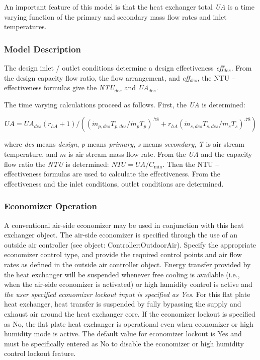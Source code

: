 An important feature of this model is that the heat exchanger total \emph{UA} is a time varying function of the primary and secondary mass flow rates and inlet temperatures.

\subsubsection{Model Description}\label{model-description-1-007}

The design inlet / outlet conditions determine a design effectiveness \emph{eff}\(_{des}\). From the design capacity flow ratio, the flow arrangement, and \emph{eff}\(_{des}\), the NTU -- effectiveness formulas give the \emph{NTU\(_{des}\)} and \emph{UA\(_{des}\)}.

The time varying calculations proceed as follows. First, the \emph{UA} is determined:

\begin{equation}
UA = U{A_{des}}({r_{hA}} + 1)/({({\dot m_{p,des}}{T_{p,des}}/{\dot m_p}{T_p})^{.78}} + {r_{hA}}{({\dot m_{s,des}}{T_{s,des}}/{\dot m_s}{T_s})^{.78}})
\end{equation}

where \emph{des} means \emph{design}, \emph{p} means \emph{primary}, \emph{s} means \emph{secondary}, \emph{T} is air stream temperature, and \(\dot m\) is air stream mass flow rate. From the \emph{UA} and the capacity flow ratio the \emph{NTU} is determined: \(NTU = UA/{C_{\min }}\). Then the NTU -- effectiveness formulas are used to calculate the effectiveness. From the effectiveness and the inlet conditions, outlet conditions are determined.

\subsubsection{Economizer Operation}\label{economizer-operation-1}

A conventional air-side economizer may be used in conjunction with this heat exchanger object. The air-side economizer is specified through the use of an outside air controller (see object: Controller:OutdoorAir). Specify the appropriate economizer control type, and provide the required control points and air flow rates as defined in the outside air controller object. Energy transfer provided by the heat exchanger will be suspended whenever free cooling is available (i.e., when the air-side economizer is activated) or high humidity control is active and \emph{the user specified economizer lockout input is specified as Yes}. For this flat plate heat exchanger, heat transfer is suspended by fully bypassing the supply and exhaust air around the heat exchanger core. If the economizer lockout is specified as No, the flat plate heat exchanger is operational even when economizer or high humidity mode is active. The default value for economizer lockout is Yes and must be specifically entered as No to disable the economizer or high humidity control lockout feature.


